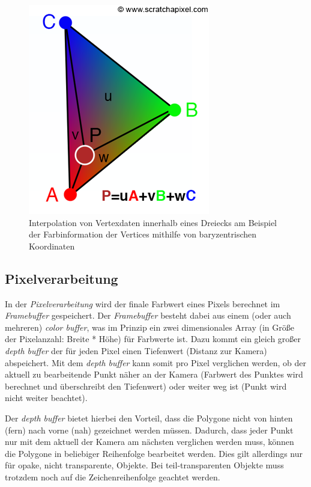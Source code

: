 \documentclass[oneside]{ausarbeitung}
\newcommand*{\quotize}[1]{\glqq #1\grqq}
\begin{document}
\begin{figure}
    \includegraphics[scale=1]{images/barycentriccolor.png}
    \caption{Interpolation von Vertexdaten innerhalb eines Dreiecks am Beispiel der Farbinformation der Vertices mithilfe von baryzentrischen Koordinaten \cite{scratchapixel:barycentric_color}}
    \label{fig:barycentric_color}
\end{figure}

\subsection{Pixelverarbeitung}
In der \textit{Pixelverarbeitung} wird der finale Farbwert eines Pixels berechnet im \textit{Framebuffer} gespeichert. Der \textit{Framebuffer} besteht dabei aus einem (oder auch mehreren) \textit{color buffer}, was im Prinzip ein zwei dimensionales Array (in Größe der Pixelanzahl: Breite * Höhe) für Farbwerte ist. Dazu kommt ein gleich großer \textit{depth buffer} der für jeden Pixel einen Tiefenwert (Distanz zur Kamera) abspeichert. Mit dem \textit{depth buffer} kann somit pro Pixel verglichen werden, ob der aktuell zu bearbeitende Punkt näher an der Kamera (Farbwert des Punktes wird berechnet und überschreibt den Tiefenwert) oder weiter weg ist (Punkt wird nicht weiter beachtet).

Der \textit{depth buffer} bietet hierbei den Vorteil, dass die Polygone nicht von \quotize{hinten (fern) nach vorne (nah)} gezeichnet werden müssen. Dadurch, dass jeder Punkt nur mit dem aktuell der Kamera am nächsten verglichen werden muss, können die Polygone in beliebiger Reihenfolge bearbeitet werden. Dies gilt allerdings nur für opake, nicht transparente, Objekte. Bei teil-transparenten Objekte muss trotzdem noch auf die Zeichenreihenfolge geachtet werden.
\end{document}
